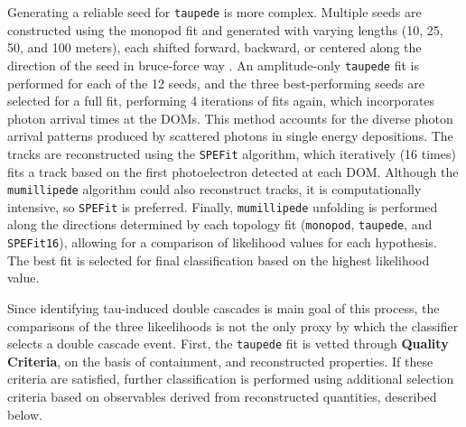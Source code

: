 \newpage
Generating a reliable seed for \texttt{taupede} is more complex. Multiple seeds are constructed using the monopod fit and generated with varying lengths (10, 25, 50, and 100 meters), each shifted forward, backward, or centered along the direction of the seed in bruce-force way . An amplitude-only \texttt{taupede} fit is performed for each of the 12 seeds, and the three best-performing seeds are selected for a full fit, performing 4 iterations of fits again, which incorporates photon arrival times at the DOMs. This method accounts for the diverse photon arrival patterns produced by scattered photons in single energy depositions. The tracks are reconstructed using the \texttt{SPEFit} algorithm, which iteratively (16 times) fits a track based on the first photoelectron detected at each DOM. Although the \texttt{mumillipede} algorithm could also reconstruct tracks, it is computationally intensive, so \texttt{SPEFit} is preferred. Finally, \texttt{mumillipede} unfolding is performed along the directions determined by each topology fit (\texttt{monopod}, \texttt{taupede}, and \texttt{SPEFit16}), allowing for a comparison of likelihood values for each hypothesis. The best fit is selected for final classification based on the highest likelihood value.

Since identifying tau-induced double cascades is main goal of this process, the comparisons of the three likeelihoods is not the only proxy by which the classifier selects a double cascade event. First, the \texttt{taupede} fit is vetted through \textbf{Quality Criteria}, on the basis of containment, and reconstructed properties. If these criteria are satisfied, further classification is performed using additional selection criteria based on observables derived from reconstructed quantities, described below.

